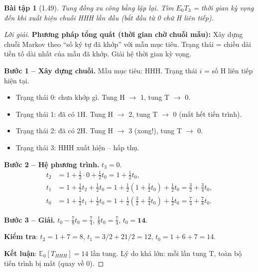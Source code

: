 \documentclass[8pt,a4paper]{article}
\newtheorem{exercise}{Bài tập}
\newenvironment{solution}{\begin{proof}[Lời giải]}{\end{proof}}
\newcommand{\E}{\mathbb{E}}
\begin{document}
\begin{exercise}[1.49]
Tung đồng xu công bằng lặp lại. Tìm $E_0 T_3$ = thời gian kỳ vọng đến khi xuất hiện chuỗi HHH lần đầu (bắt đầu từ 0 chữ H liên tiếp).
\end{exercise}
\begin{solution}
\textbf{Phương pháp tổng quát (thời gian chờ chuỗi mẫu):} Xây dựng chuỗi Markov theo ``số ký tự đã khớp'' với mẫu mục tiêu. Trạng thái = chiều dài tiền tố dài nhất của mẫu đã khớp. Giải hệ thời gian kỳ vọng.

\textbf{Bước 1 -- Xây dựng chuỗi.}
Mẫu mục tiêu: HHH. Trạng thái $i$ = số H liên tiếp hiện tại.
\begin{itemize}
  \item Trạng thái 0: chưa khớp gì. Tung H $\to$ 1, tung T $\to$ 0.
  \item Trạng thái 1: đã có 1H. Tung H $\to$ 2, tung T $\to$ 0 (mất hết tiến trình).
  \item Trạng thái 2: đã có 2H. Tung H $\to$ 3 (xong!), tung T $\to$ 0.
  \item Trạng thái 3: HHH xuất hiện -- hấp thụ.
\end{itemize}

\textbf{Bước 2 -- Hệ phương trình.} $t_3 = 0$.
\begin{align*}
  t_2 &= 1 + \tfrac{1}{2} \cdot 0 + \tfrac{1}{2} t_0 = 1 + \tfrac{1}{2}t_0, \\
  t_1 &= 1 + \tfrac{1}{2} t_2 + \tfrac{1}{2} t_0 = 1 + \tfrac{1}{2}(1 + \tfrac{1}{2}t_0) + \tfrac{1}{2}t_0 = \tfrac{3}{2} + \tfrac{3}{4}t_0, \\
  t_0 &= 1 + \tfrac{1}{2} t_1 + \tfrac{1}{2} t_0 = 1 + \tfrac{1}{2}(\tfrac{3}{2} + \tfrac{3}{4}t_0) + \tfrac{1}{2}t_0 = \tfrac{7}{4} + \tfrac{7}{8}t_0.
\end{align*}

\textbf{Bước 3 -- Giải.}
$t_0 - \frac{7}{8}t_0 = \frac{7}{4}$, $\frac{1}{8}t_0 = \frac{7}{4}$, $t_0 = \mathbf{14}$.

\textbf{Kiểm tra}: $t_2 = 1 + 7 = 8$, $t_1 = 3/2 + 21/2 = 12$, $t_0 = 1 + 6 + 7 = 14$. \checkmark

\textbf{Kết luận}: $\E_0[T_{HHH}] = 14$ lần tung. Lý do khá lớn: mỗi lần tung T, toàn bộ tiến trình bị mất (quay về 0).
\end{solution}
\end{document}
